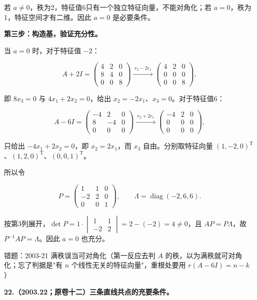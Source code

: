 \documentclass[UTF8,11pt,fontset=windows]{ctexart}
\begin{document}
若 $a\ne0$，秩为2，特征值6只有一个独立特征向量，不能对角化；若 $a=0$，秩为1，特征空间才有二维。因此 $a=0$ 是必要条件。

\textbf{第三步：构造基，验证充分性。}

当 $a=0$ 时，对于特征值 $-2$：

$$
A+2I=\begin{pmatrix}4&2&0\\8&4&0\\0&0&8\end{pmatrix}
\xrightarrow{\;r_2-2r_1\;}
\begin{pmatrix}4&2&0\\0&0&0\\0&0&8\end{pmatrix},
$$

即 $8x_3=0$ 与 $4x_1+2x_2=0$，给出 $x_2=-2x_1$、$x_3=0$。对于特征值6：

$$
A-6I=\begin{pmatrix}-4&2&0\\8&-4&0\\0&0&0\end{pmatrix}
\xrightarrow{\;r_2+2r_1\;}
\begin{pmatrix}-4&2&0\\0&0&0\\0&0&0\end{pmatrix},
$$

只给出 $-4x_1+2x_2=0$，即 $x_2=2x_1$，而 $x_3$ 自由。分别取特征向量 $(1,-2,0)^{\mathrm T}$、$(1,2,0)^{\mathrm T}$、$(0,0,1)^{\mathrm T}$。

所以令

$$
P=\begin{pmatrix}1&1&0\\-2&2&0\\0&0&1\end{pmatrix},
\qquad \Lambda=\operatorname{diag}(-2,6,6).
$$

按第3列展开，$\det P=1\cdot\begin{vmatrix}1&1\\-2&2\end{vmatrix}=2-(-2)=4\ne0$，且 $AP=P\Lambda$，故 $P^{-1}AP=\Lambda$。因此 $a=0$ 也充分。

\begingroup\color{gray}错题：2003-21 满秩误当可对角化（第一反应去判 $A$ 的秩，以为满秩就可对角化；忘了判据是"有 $n$ 个线性无关的特征向量"，重根处要用 $r(A-6I)=n-k$）\par\endgroup

\clearpage

\textbf{22.（2003.22；原卷十二）三条直线共点的充要条件。}
\end{document}

